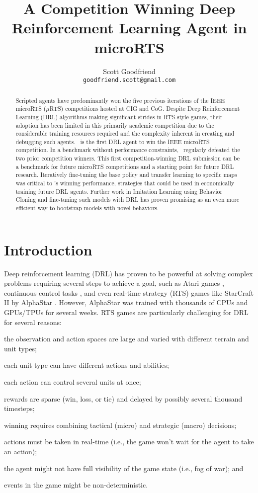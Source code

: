 \documentclass{article}
\title{A Competition Winning Deep Reinforcement Learning Agent in microRTS}
\author{Scott Goodfriend \\
\texttt{goodfriend.scott@gmail.com} \\
}
\begin{document}
\maketitle
\begin{abstract}
Scripted agents have predominantly won the five
previous iterations of the IEEE microRTS ($\mu$RTS) competitions hosted at CIG and
CoG. Despite Deep Reinforcement Learning (DRL) algorithms making significant strides
in RTS-style games, their adoption has been limited in this primarily academic
competition due to the considerable training resources required and the complexity
inherent in creating and debugging such agents. \agentName\ is the first DRL agent
to win the IEEE microRTS competition. In a benchmark without performance
constraints, \agentName\ regularly defeated the two
prior competition winners. This first competition-winning DRL submission can be
a benchmark for future microRTS competitions and a starting point for future DRL
research. Iteratively fine-tuning the base policy and transfer learning to specific maps was 
critical to \agentName's winning performance, strategies that could be used in
economically training future DRL agents. Further work in Imitation Learning using Behavior Cloning and
fine-tuning such models with DRL has proven promising as an even more efficient way
to bootstrap models with novel behaviors.
\end{abstract}
\section{Introduction}
Deep reinforcement learning (DRL) has proven to be powerful at solving complex
problems requiring several steps to achieve a goal, such as Atari games \citep{DBLP:journals/corr/MnihKSGAWR13}, continuous
control tasks \citep{DBLP:journals/corr/LillicrapHPHETS15}, and even real-time strategy
(RTS) games like StarCraft II by AlphaStar \citep{Vinyals2019GrandmasterLI}. However, AlphaStar was trained with thousands of
CPUs and GPUs/TPUs for several weeks. RTS games are particularly challenging for DRL for
several reasons:
\begin{inparaenum}[(1)]
    \item the observation and action spaces are large and varied with different terrain and
        unit types;
    \item each unit type can have different actions and abilities;
    \item each action can control several units at once;
    \item rewards are sparse (win, loss, or tie) and delayed by possibly several
    thousand timesteps;
    \item winning requires combining tactical (micro) and strategic (macro) decisions;
    \item actions must be taken in real-time (i.e., the game won't wait for the agent to
        take an action);
    \item the agent might not have full visibility of the game state (i.e., fog of war); and
    \item events in the game might be non-deterministic.
\end{inparaenum}
\end{document}

